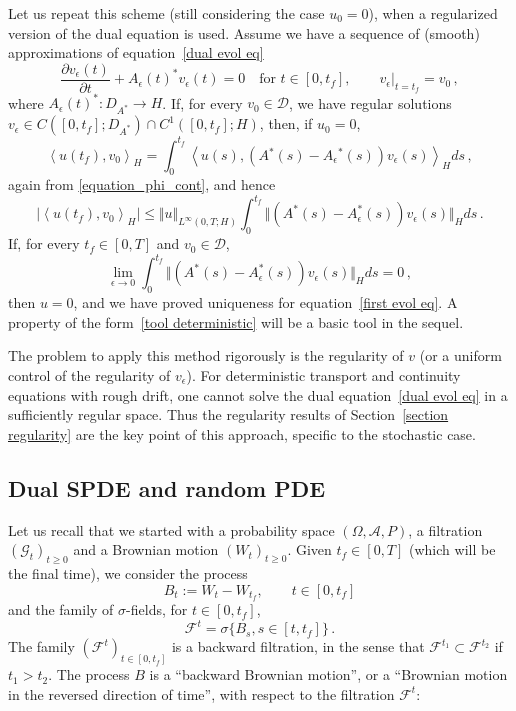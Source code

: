 \documentclass[a4paper,10pt]{article}
\begin{document}
Let us repeat this scheme (still considering the case $u_0=0$), when a regularized 
version of the dual equation is used. Assume we have a sequence of (smooth) approximations of equation~\eqref{dual evol eq}
\begin{equation*}
\frac{\partial v_{\epsilon} (t)}{\partial t}+A_{\epsilon}(t)^{\ast} v_{\epsilon}(t) =0 \quad \text{for } t\in[0,t_{f}], 
\qquad v_{\epsilon}|_{t=t_{f}} = v_{0} \, ,
\end{equation*}
where $A_{\epsilon}(t)^{\ast} \colon D_{A^{\ast}}\rightarrow H$. If,
for every $v_{0}\in\mathcal{D}$, we have regular solutions $v_{\epsilon}\in
C([0,t_{f}];D_{A^{\ast}}) \cap C^{1}([0,t_{f}];H)$, then, if $u_0=0$,
\begin{equation}
\left\langle u(t_{f}),v_{0}\right\rangle _{H}=\int_{0}^{t_{f}
}\left\langle u(s)  ,(  A{}^{\ast}(s) - A_{\epsilon}{}^{\ast}(s) )  v_{\epsilon}(s)
\right\rangle _{H}ds \, , \label{duality formula determ}
\end{equation}
again from \eqref{equation_phi_cont}, and hence
\[
\vert \left\langle u(t_{f}),v_{0}\right\rangle_{H} \vert \leq \Vert u\Vert _{L^{\infty}(0,T;H)} \int_{0}^{t_{f}} \Vert ( A^{\ast}(s) - A_{\epsilon}^{\ast}(s) )  v_{\epsilon}(s)  \Vert_{H}ds \, .
\]
If, for every $t_{f}\in [0,T]$ and $v_{0}\in\mathcal{D}$,
\begin{equation}
\lim_{\epsilon\rightarrow0}\int_{0}^{t_{f}} \Vert ( A^{\ast}(s)  -A_{\epsilon}^{\ast}(s))
v_{\epsilon} (s) \Vert_{H}ds=0 \label{tool deterministic} \, ,
\end{equation}
then $u=0$, and we have proved uniqueness for equation~\eqref{first evol eq}.
A property of the form~\eqref{tool deterministic} will be a basic tool in the sequel.

The problem to apply this method rigorously is the regularity of $v$ (or a
uniform control of the regularity of $v_{\epsilon}$). For deterministic
transport and continuity equations with rough drift, one cannot solve the dual
equation~\eqref{dual evol eq} in a sufficiently regular space. Thus the
regularity results of Section~\ref{section regularity} are the key point of
this approach, specific to the stochastic case.

\subsection{Dual SPDE and random PDE}

Let us recall that we started with a probability space $(\Omega
,\mathcal{A},P)$, a filtration $(\mathcal{G}_{t})_{t\geq0}$ and a Brownian motion $(  W_{t})  _{t\geq0}$. Given $t_{f}\in [0,T]$ (which will be the final time), we consider the process
\[
B_{t}:=W_{t}-W_{t_{f}},\qquad t\in [0,t_{f}]
\]
and the family of $\sigma$-fields, for $t \in [0,t_{f}]$,
\[
\mathcal{F}^{t}=\sigma \{  B_{s},s\in [t,t_{f}] \} \,.
\]
The family $(\mathcal{F}^{t})_{t\in [0,t_{f}]}$
is a backward filtration, in the sense that $\mathcal{F}^{t_{1}}
\subset\mathcal{F}^{t_{2}}$ if $t_{1}>t_{2}$. The process $B$ is a
\textquotedblleft backward Brownian motion\textquotedblright, or a
\textquotedblleft Brownian motion in the reversed direction of
time\textquotedblright, with respect to the filtration $\mathcal{F}^{t}$:
\end{document}

